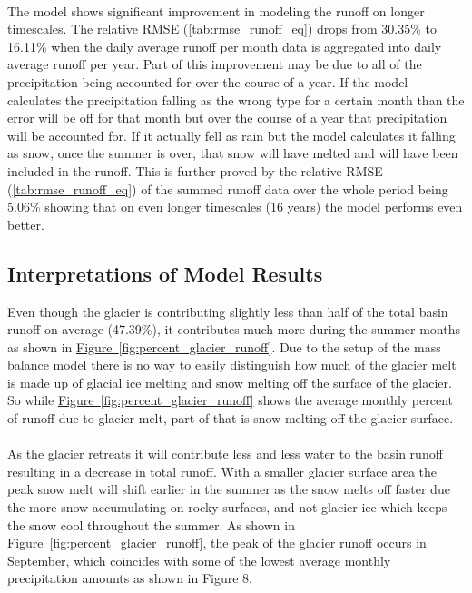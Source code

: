 \documentclass{article}
\begin{document}
\paragraph{}
The model shows significant improvement in modeling the runoff on longer timescales. The relative RMSE (\ref{tab:rmse_runoff_eq}) drops from 30.35\% to 16.11\% when the 
daily average runoff per month data is aggregated into daily average runoff per year. Part of this improvement may be due to all of the 
precipitation being accounted for over the course of a year. If the model calculates the precipitation falling as the wrong type for a certain 
month than the error will be off for that month but over the course of a year that precipitation will be accounted for. If it actually fell as 
rain but the model calculates it falling as snow, once the summer is over, that snow will have melted and will have been included in the runoff. This is further 
proved by the relative RMSE (\ref{tab:rmse_runoff_eq}) of the summed runoff data over the whole period being 5.06\% showing that on even longer timescales (16 years) the model 
performs even better.  
\subsection{Interpretations of Model Results}
Even though the glacier is contributing slightly less than half of the total basin runoff on average (47.39\%), it contributes much more during the summer 
months as shown in \hyperref[fig:percent_glacier_runoff]{Figure~\ref{fig:percent_glacier_runoff}}. Due to the setup of the mass balance model there is no way to easily distinguish how much of the glacier melt is made 
up of glacial ice melting and snow melting off the surface of the glacier. So while \hyperref[fig:percent_glacier_runoff]{Figure~\ref{fig:percent_glacier_runoff}} shows the average monthly percent of runoff due to glacier 
melt, part of that is snow melting off the glacier surface. 
\paragraph{}
As the glacier retreats it will contribute less and less water to the basin runoff resulting in a decrease in total runoff. With a smaller glacier 
surface area the peak snow melt will shift earlier in the summer as the snow melts off faster due the more snow accumulating on rocky surfaces, and not glacier 
ice which keeps the snow cool throughout the summer. As shown in \hyperref[fig:percent_glacier_runoff]{Figure~\ref{fig:percent_glacier_runoff}}, the peak of the glacier runoff occurs in September, which coincides 
with some of the lowest average monthly precipitation amounts as shown in Figure 8.
\end{document}
